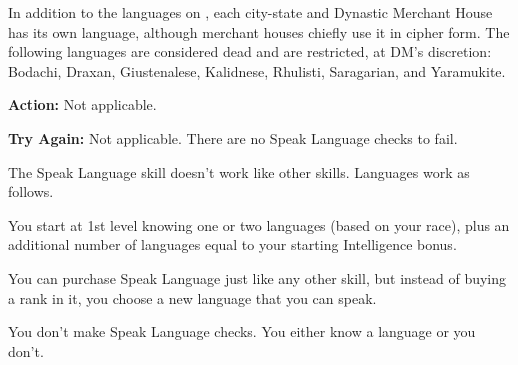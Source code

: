 

In addition to the languages on , each city-state and Dynastic Merchant House has its own language, although merchant houses chiefly use it in cipher form. The following languages are considered dead and are restricted, at DM's discretion: Bodachi, Draxan, Giustenalese, Kalidnese, Rhulisti, Saragarian, and Yaramukite.

\textbf{Action:} Not applicable.

\textbf{Try Again:} Not applicable. There are no Speak Language checks to fail.

The Speak Language skill doesn't work like other skills. Languages work as follows.

\begin{itemize*}
\item You start at 1st level knowing one or two languages (based on your race), plus an additional number of languages equal to your starting Intelligence bonus.
\item You can purchase Speak Language just like any other skill, but instead of buying a rank in it, you choose a new language that you can speak.
\item You don't make Speak Language checks. You either know a language or you don't.
\end{itemize*}

